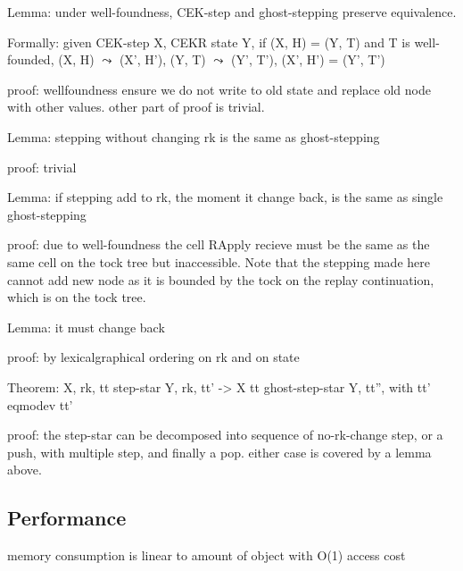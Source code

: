 Lemma: under well-foundness, CEK-step and ghost-stepping preserve equivalence.

Formally: given CEK-step X, CEKR state Y, if (X, H) = (Y, T) and T is well-founded, (X, H) $\leadsto$ (X', H'), (Y, T) $\leadsto$ (Y', T'), (X', H') = (Y', T')

proof: wellfoundness ensure we do not write to old state and replace old node with other values. other part of proof is trivial.

Lemma: stepping without changing rk is the same as ghost-stepping

proof: trivial

Lemma: if stepping add to rk, the moment it change back, is the same as single ghost-stepping

proof: due to well-foundness the cell RApply recieve must be the same as the same cell on the tock tree but inaccessible. Note that the stepping made here cannot add new node as it is bounded by the tock on the replay continuation, which is on the tock tree.

Lemma: it must change back

proof: by lexicalgraphical ordering on rk and on state

Theorem: X, rk, tt step-star Y, rk, tt' -> X tt ghost-step-star Y, tt'', with tt' eqmodev tt'

proof: the step-star can be decomposed into sequence of no-rk-change step, or a push, with multiple step, and finally a pop. either case is covered by a lemma above.

\subsection{Performance}
memory consumption is linear to amount of object with O(1) access cost
